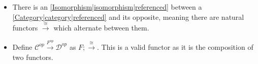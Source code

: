 \begin{itemize}
    \item  There is an \ref{Isomorphism|isomorphism|referenced} between a \ref{Category|category|referenced} and its opposite, meaning there are natural functors $\overset{\cong}\rightarrow$ which alternate between them.
    \item Define $\mathcal{C}^{op}\xrightarrow{F^{op}}\mathcal{D}^{op}$ as $F ; \overset{\cong}\rightarrow$. This is a valid functor as it is the composition of two functors.
  \end{itemize}
